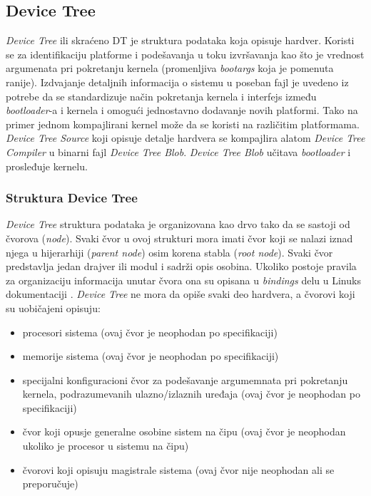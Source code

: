 \subsection{Device Tree}
\textit{Device Tree} ili skraćeno DT je struktura podataka koja opisuje hardver. Koristi se za identifikaciju platforme i podešavanja u toku izvršavanja kao što je vrednost argumenata pri pokretanju kernela (promenljiva \textit{bootargs} koja je pomenuta ranije). Izdvajanje detaljnih informacija o sistemu u poseban fajl je uvedeno iz potrebe da se standardizuje način pokretanja kernela i interfejs između \textit{bootloader}-a i kernela i omogući jednostavno dodavanje novih platformi. Tako na primer jednom kompajlirani kernel može da se koristi na različitim platformama. \textit{Device Tree Source} koji opisuje detalje hardvera se kompajlira alatom \textit{Device Tree Compiler} u binarni fajl \textit{Device Tree Blob}. \textit{Device Tree Blob} učitava \textit{bootloader} i prosleđuje kernelu.
\subsubsection{Struktura Device Tree}
\textit{Device Tree} struktura podataka je organizovana kao drvo tako da se sastoji od čvorova (\textit{node}). Svaki čvor u ovoj strukturi mora imati čvor koji se nalazi iznad njega u hijerarhiji (\textit{parent node}) osim korena stabla (\textit{root node}). Svaki čvor predstavlja jedan drajver ili modul i sadrži opis osobina. Ukoliko postoje pravila za organizaciju informacija unutar čvora ona su opisana u \textit{bindings} delu u Linuks dokumentaciji \cite{bindings}. \textit{Device Tree} ne mora da opiše svaki deo hardvera, a čvorovi koji su uobičajeni opisuju:
\begin{itemize}
\item procesori sistema (ovaj čvor je neophodan po specifikaciji)
\item memorije sistema (ovaj čvor je neophodan po specifikaciji)
\item specijalni konfiguracioni čvor za podešavanje argumemnata pri pokretanju kernela, podrazumevanih ulazno/izlaznih uređaja (ovaj čvor je neophodan po specifikaciji)
\item čvor koji opusje generalne osobine sistem na čipu (ovaj čvor je neophodan ukoliko je procesor u sistemu na čipu)
\item čvorovi koji opisuju magistrale sistema (ovaj čvor nije neophodan ali se preporučuje)
\end{itemize}

